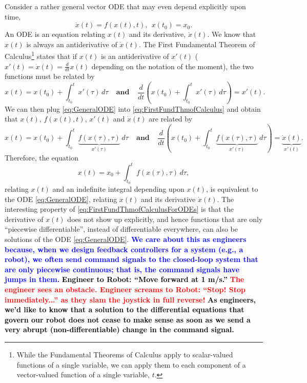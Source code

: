 Consider a rather general vector ODE that may even depend explicitly upon time,
\begin{equation}
\label{eq:GeneralODE}
    \dot{x}(t) = f(x(t), t), ~~x(t_0) = x_0.
\end{equation}
An ODE is an equation relating $x(t)$ and its derivative, $\dot{x}(t)$. We know that $x(t)$ is always an antiderivative of $\dot{x}(t)$. The First Fundamental Theorem of Calculus\footnote{While the Fundamental Theorems of Calculus apply to scalar-valued functions of a single variable, we can apply them to each component of a vector-valued function of a single variable, $t$.} 
%
states that if $x(t)$ is an antiderivative of $x'(t)$ ($ x'(t) = \dot{x}(t)=\frac{d}{dt} x(t)$ depending on the notation of the moment), the two functions must be related by 
\begin{equation}
\label{eq:FirstFundThmofCalculus}
    x(t) = x(t_0) + \int_{t_0}^t  x'(\tau) \, d \tau~~~~~ \textbf{and}~~~~~ \frac{d}{dt} \left( x(t_0) + \int_{t_0}^t  x'(\tau) \, d \tau \right) =   x'(t).
\end{equation}
We can then plug \eqref{eq:GeneralODE} into \eqref{eq:FirstFundThmofCalculus} and obtain that $x(t)$, $f(x(t), t)$, $x'(t)$ and $\dot{x}(t)$ are related by
\begin{equation}
\label{eq:FirstFundThmofCalculusMeetsODE}
    x(t) = x(t_0) + \int_{t_0}^t \underbrace{f(x(\tau), \tau)}_{x'(\tau)} \, d \tau~~~~~ \textbf{and}~~~~~ \frac{d}{dt} \left( x(t_0) + \int_{t_0}^t  \underbrace{f(x(\tau), \tau)}_{x'(\tau)} \, d \tau \right) =   \underbrace{\dot{x}(t)}_{x'(t)}.
\end{equation}
Therefore, the equation 
\begin{equation}
\label{eq:FirstFundThmofCalculusForODEs}
x(t) = x_0 + \int_{t_0}^t f(x(\tau), \tau) \, d \tau,
\end{equation}
relating $x(t)$ and an indefinite integral depending upon $x(t)$, is equivalent to the ODE \eqref{eq:GeneralODE}, relating $x(t)$ and its derivative $\dot{x}(t)$. The interesting property of \eqref{eq:FirstFundThmofCalculusForODEs} is that the derivative of $x(t)$ does not show up explicitly, and hence functions that are only ``piecewise differentiable'', instead of differentiable everywhere, can also be solutions of the ODE \eqref{eq:GeneralODE}. \textcolor{blue}{\bf We care about this as engineers because, when we design feedback controllers for a system (e.g., a robot), we often send command signals to the closed-loop system that are only piecewise continuous; that is, the command signals have jumps in them.} \textcolor{black}{\bf Engineer to Robot: ``Move forward at 1 m/s.''} \textcolor{red}{\bf The engineer sees an obstacle. Engineer screams to Robot: ``Stop! Stop immediately...'' as they slam the joystick in full reverse!} \textcolor{black}{\bf As engineers, we'd like to know that a solution to the differential equations that govern our robot does not cease to make sense as soon as we send a very abrupt (non-differentiable) change in the command signal.} 



